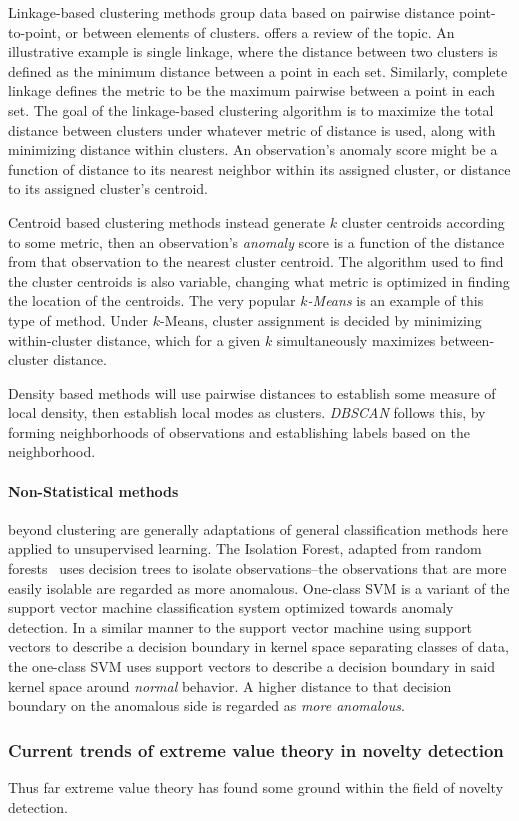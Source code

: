 Linkage-based clustering methods group data based on pairwise distance point-to-point, or between
    elements of clusters.  \cite{ackerman2010} offers a review of the topic.  An illustrative example
    is single linkage, where the distance between two clusters is defined as the minimum distance between
    a point in each set.   Similarly, complete linkage defines the metric to be the maximum pairwise
    between a point in each set.  The goal of the linkage-based clustering algorithm is to maximize the
    total distance between clusters under whatever metric of distance is used, along with minimizing
    distance within clusters.  An observation's anomaly score might be a function of distance to its nearest
    neighbor within its assigned cluster, or distance to its assigned cluster's centroid.

Centroid based clustering methods instead generate $k$ cluster centroids according to some metric,
    then an observation's \emph{anomaly} score is a function of the distance from that
    observation to the nearest cluster centroid.  The algorithm used to find the cluster
    centroids is also variable, changing what metric is optimized in finding the location of the
    centroids.  The very popular \emph{$k$-Means} \citep{hartigan1979} is an example of this type of
    method.  Under $k$-Means, cluster assignment is decided by minimizing within-cluster distance,
    which for a given $k$ simultaneously maximizes between-cluster distance.

Density based methods will use pairwise distances to establish some measure of local density, then
    establish local modes as clusters.  \emph{DBSCAN} \citep{ester1996} follows this, by forming
    neighborhoods of observations and establishing labels based on the neighborhood.

\paragraph{Non-Statistical methods} beyond clustering are generally adaptations of general 
    classification methods here applied to unsupervised learning.  The Isolation Forest,\citep{liu2000}
    adapted from random forests~\citep{breiman2001} uses decision trees to isolate observations--the
    observations that are more easily isolable are regarded as more anomalous.  One-class SVM
    \citep{chang2011} is a variant of the support vector machine classification system optimized towards
    anomaly detection. In a similar manner to the support vector machine using support vectors to
    describe a decision boundary in kernel space separating classes of data, the one-class SVM uses 
    support vectors to describe a decision boundary in said kernel space around \emph{normal} behavior.
    A higher distance to that decision boundary on the anomalous side is regarded as \emph{more anomalous}.
    
\subsubsection{Current trends of extreme value theory in novelty detection}

Thus far extreme value theory has found some ground within the field of novelty detection. 






